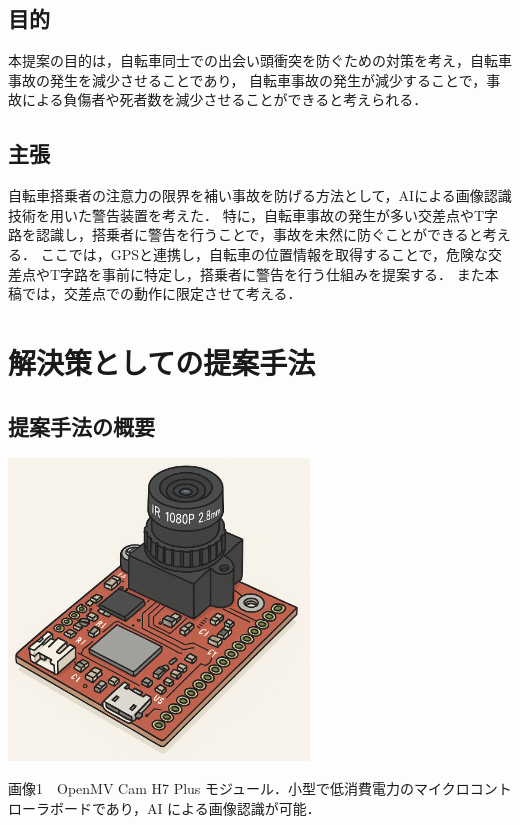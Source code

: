 \documentclass[uplatex,dvipdfmx]{jsarticle}
\begin{document}
\subsection{目的}

\indent
本提案の目的は，自転車同士での出会い頭衝突を防ぐための対策を考え，自転車事故の発生を減少させることであり，
自転車事故の発生が減少することで，事故による負傷者や死者数を減少させることができると考えられる．
\par

\subsection{主張}
自転車搭乗者の注意力の限界を補い事故を防げる方法として，AIによる画像認識技術を用いた警告装置を考えた．
特に，自転車事故の発生が多い交差点やT字路を認識し，搭乗者に警告を行うことで，事故を未然に防ぐことができると考える．
ここでは，GPSと連携し，自転車の位置情報を取得することで，危険な交差点やT字路を事前に特定し，搭乗者に警告を行う仕組みを提案する．
また本稿では，交差点での動作に限定させて考える．



\section{解決策としての提案手法}
\subsection{提案手法の概要}
\begin{center}
  \includegraphics[width=8cm]{./Figs/OpenMV_image.png}
  
  \vspace{2mm}
  画像1　OpenMV Cam H7 Plus モジュール．小型で低消費電力のマイクロコントローラボードであり，AI による画像認識が可能．\cite{ref:openmv}
\end{center}
\end{document}
